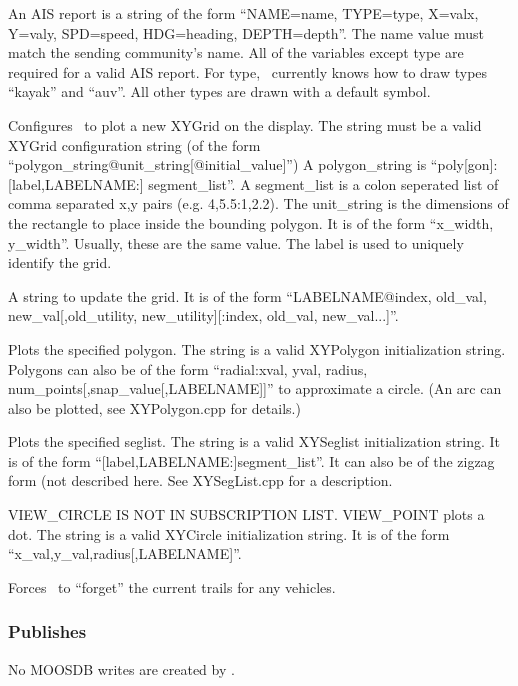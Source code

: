 \begin{hangpar}{\pin}{}
An AIS report is a string of the form ``NAME=name, TYPE=type, X=valx, Y=valy, SPD=speed, HDG=heading, DEPTH=depth''.  The name value must match the sending community's name.  All of the variables except type are required for a valid AIS report.  For type, \pmv\ currently knows how to draw types ``kayak'' and ``auv''.  All other types are drawn with a default symbol.
\end{hangpar}
\begin{hangpar}{\pin}{}
Configures \pmv\ to plot a new XYGrid on the display.  The string must be a valid XYGrid configuration string (of the form ``polygon\_string@unit\_string[@initial\_value]'')  A polygon\_string is ``poly[gon]: [label,LABELNAME:] segment\_list''.  A segment\_list is a colon seperated list of comma separated x,y pairs (e.g. 4,5.5:1,2.2).  The unit\_string is the dimensions of the rectangle to place inside the bounding polygon.  It is of the form ``x\_width, y\_width''.  Usually, these are the same value.  The label is used to uniquely identify the grid.
\end{hangpar}
\begin{hangpar}{\pin}{}
A string to update the grid.  It is of the form ``LABELNAME@index, old\_val, new\_val[,old\_utility, new\_utility][:index, old\_val, new\_val...]''.
\end{hangpar}
\begin{hangpar}{\pin}{}
Plots the specified polygon.  The string is a valid XYPolygon initialization string.  Polygons can also be of the form ``radial:xval, yval, radius, num\_points[,snap\_value[,LABELNAME]]'' to approximate a circle.  (An arc can also be plotted, see XYPolygon.cpp for details.)
\end{hangpar}
\begin{hangpar}{\pin}{}
Plots the specified seglist.  The string is a valid XYSeglist initialization string.  It is of the form ``[label,LABELNAME:]segment\_list''.  It can also be of the zigzag form (not described here.  See XYSegList.cpp for a description.
\end{hangpar}
\begin{hangpar}{\pin}{}
VIEW\_CIRCLE IS NOT IN SUBSCRIPTION LIST.  VIEW\_POINT plots a dot.  The string is a valid XYCircle initialization string.  It is of the form ``x\_val,y\_val,radius[,LABELNAME]''.
\end{hangpar}
\begin{hangpar}{\pin}{}
Forces \pmv\ to ``forget'' the current trails for any vehicles.
\end{hangpar}
\subsubsection{Publishes}
No MOOSDB writes are created by \pmv.
